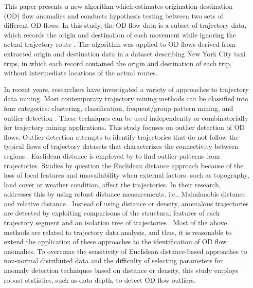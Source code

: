 \documentclass[a4paper,UKenglish]{lipics-v2018}
\begin{document}
This paper presents a new algorithm which estimates origination-destination (OD) flow anomalies and conducts hypothesis testing between two sets of different OD flows. In this study,  the OD flow data is a subset of trajectory data, which records the origin and destination of each movement while ignoring the actual trajectory route \cite{guo14IEEETVCG}.  
The algorithm was applied to OD flows derived from extracted origin and destination data in a dataset describing New York City taxi trips, in which each record contained the origin and destination of each trip, without intermediate locations of the actual routes.


In recent years, researchers have investigated a variety of approaches to trajectory data mining.
Most contemporary trajectory mining methods can be classified into four categories: clustering, classification, frequent/group pattern mining, and outlier detection \cite{mazimpaka16JOSIS,zheng15ACMTIST}. These techniques can be used independently or combinatorially for trajectory mining applications. This study focuses on outlier detection of OD flows. Outlier detection attempts to identify trajectories that do not follow the typical flows of trajectory datasets that characterizes the connectivity between regions \cite{mazimpaka16JOSIS}. Euclidean distance is employed by  \cite{fontes13GeoInfo,lee08ICDE} to find outlier patterns from trajectories. Studies by \cite{pan13ACMGIS,liu12IJGIS} question the Euclidean distance approach because of the loss of local features and unavailability when external factors, such as topography, land cover or weather condition,   affect the trajectories. In their research,  \cite{pan13ACMGIS,liu12IJGIS} addresses this by using robust distance measurements, i.e., Mahalanobis distance \cite{pan13ACMGIS} and relative distance \cite{liu12IJGIS}. Instead of using distance or density, anomalous trajectories are detected by exploiting comparisons of the structural features of each trajectory segment \cite{yuan11JCIS} and an isolation tree of trajectories  \cite{zhang11UC}.
Most of the above methods are related to trajectory data analysis, and thus, it is reasonable to extend the application of these approaches to the identification of OD flow anomalies. 
To overcome the sensitivity of Euclidean distance-based approaches to non-normal distributed data and the difficulty of selecting parameters for anomaly detection techniques based on distance or density, this study employs robust statistics, such as data depth, to detect OD flow outliers.

\end{document}
